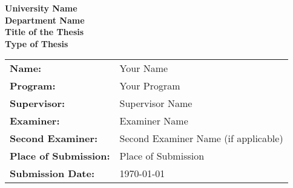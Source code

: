 
\begin{titlepage}
    \begin{center}
        \vspace*{1cm}
        
        {\LARGE \textbf{University Name}}\\[0.5cm]
        {\Large \textbf{Department Name}}\\[1.5cm]
        
        {\Huge \textbf{Title of the Thesis}}\\[0.5cm]
        {\Large \textbf{Type of Thesis}}\\[1.5cm]
        \vspace*{14cm}
    \end{center}

        \begin{tabular}{ll}
            \textbf{Name:} & Your Name \\
            \textbf{Program:} & Your Program \\
            \textbf{Supervisor:} & Supervisor Name \\
            \textbf{Examiner:} & Examiner Name \\
            \textbf{Second Examiner:} & Second Examiner Name (if applicable) \\
            \textbf{Place of Submission:} & Place of Submission \\
            \textbf{Submission Date:} & \today
        \end{tabular}
    
\end{titlepage}

